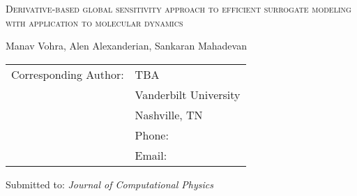 \begin{center}
\textsc{
Derivative-based global sensitivity approach to 
efficient surrogate modeling with application to molecular dynamics
}

\bigskip 

\bigskip 

Manav Vohra, Alen Alexanderian, Sankaran Mahadevan

\end{center}

\vspace{10cm}

\begin{tabular}{ll}
Corresponding Author:  & TBA \\
                       & Vanderbilt University \\ 
                       & Nashville, TN\\ 
                       & Phone: \\ 
                       & Email: 
\end{tabular}

\bigskip

Submitted to: \emph{Journal of Computational Physics}
              



\clearpage

